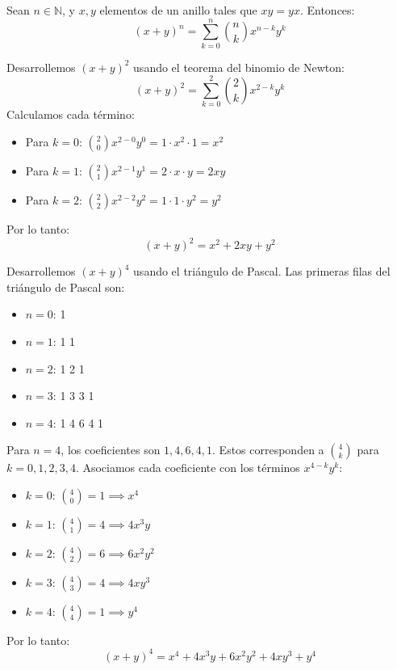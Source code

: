 \documentclass[a4paper,12pt]{article}
\begin{document}
\begin{procedimiento}[title=Teorema del binomio de Newton]
Sean $n \in \mathbb{N}$, y $x, y$ elementos de un anillo tales que $xy = yx$. Entonces:
\[
(x + y)^n = \sum_{k=0}^n \binom{n}{k} x^{n-k} y^k
\]
\end{procedimiento}

\begin{ejemplo}[title=Ejemplo: $(x + y)^2$]
Desarrollemos $(x + y)^2$ usando el teorema del binomio de Newton:
\[
(x + y)^2 = \sum_{k=0}^2 \binom{2}{k} x^{2-k} y^k
\]
Calculamos cada término:
\begin{itemize}
    \item Para $k = 0$: $\binom{2}{0} x^{2-0} y^0 = 1 \cdot x^2 \cdot 1 = x^2$
    \item Para $k = 1$: $\binom{2}{1} x^{2-1} y^1 = 2 \cdot x \cdot y = 2xy$
    \item Para $k = 2$: $\binom{2}{2} x^{2-2} y^2 = 1 \cdot 1 \cdot y^2 = y^2$
\end{itemize}
Por lo tanto:
\[
(x + y)^2 = x^2 + 2xy + y^2
\]
\end{ejemplo}

\begin{ejemplo}[title=Ejemplo: $(x + y)^4$]
Desarrollemos $(x + y)^4$ usando el triángulo de Pascal. Las primeras filas del triángulo de Pascal son:
\begin{itemize}
    \item $n=0$: 1
    \item $n=1$: 1 1
    \item $n=2$: 1 2 1
    \item $n=3$: 1 3 3 1
    \item $n=4$: 1 4 6 4 1
\end{itemize}
Para $n=4$, los coeficientes son $1, 4, 6, 4, 1$. Estos corresponden a $\binom{4}{k}$ para $k = 0, 1, 2, 3, 4$. Asociamos cada coeficiente con los términos $x^{4-k} y^k$:
\begin{itemize}
    \item $k=0$: $\binom{4}{0} = 1 \implies x^4$
    \item $k=1$: $\binom{4}{1} = 4 \implies 4 x^3 y$
    \item $k=2$: $\binom{4}{2} = 6 \implies 6 x^2 y^2$
    \item $k=3$: $\binom{4}{3} = 4 \implies 4 x y^3$
    \item $k=4$: $\binom{4}{4} = 1 \implies y^4$
\end{itemize}
Por lo tanto:
\[
(x + y)^4 = x^4 + 4 x^3 y + 6 x^2 y^2 + 4 x y^3 + y^4
\]
\end{ejemplo}
\end{document}
